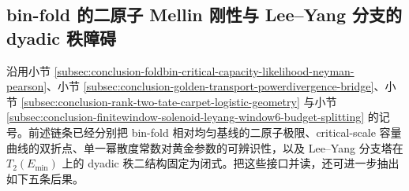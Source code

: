 \subsection{bin-fold 的二原子 Mellin 刚性与 Lee--Yang 分支的 dyadic 秩障碍}\label{subsec:conclusion-binfold-twoatom-mellin-leyang-dyadic-rank}

沿用小节 \ref{subsec:conclusion-foldbin-critical-capacity-likelihood-neyman-pearson}、小节 \ref{subsec:conclusion-golden-transport-powerdivergence-bridge}、小节 \ref{subsec:conclusion-rank-two-tate-carpet-logistic-geometry} 与小节 \ref{subsec:conclusion-finitewindow-solenoid-leyang-window6-budget-splitting} 的记号。前述链条已经分别把 bin-fold 相对均匀基线的二原子极限、critical-scale 容量曲线的双折点、单一幂散度常数对黄金参数的可辨识性，以及 Lee--Yang 分支塔在 \(T_2(E_{\min})\) 上的 dyadic 秩二结构固定为闭式。把这些接口并读，还可进一步抽出如下五条后果。

